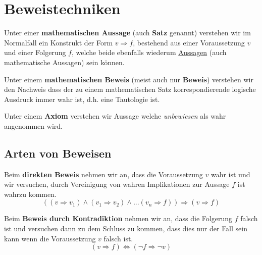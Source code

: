 \documentclass[../../main.tex]{subfiles}
\begin{document}
	
	\chapter{Beweistechniken}
	
	\begin{definition}
		\label{def:MathematischeAussage}
		Unter einer \textbf{mathematischen Aussage} (auch \textbf{Satz} genannt) verstehen wir im Normalfall ein Konstrukt der Form $v \Rightarrow f$, bestehend aus einer Voraussetzung $v$ und einer Folgerung $f$, welche beide ebenfalls wiederum \hyperref[def:Aussage]{Aussagen} (auch mathematische Aussagen) sein können.
	\end{definition}

	\begin{definition}
		\label{def:MathematischerBeweis}
		Unter einem \textbf{mathematischen Beweis} (meist auch nur \textbf{Beweis}) verstehen wir den Nachweis dass der zu einem mathematischen Satz korrespondierende logische Ausdruck immer wahr ist, d.h. eine Tautologie ist.
	\end{definition}

	\begin{definition}[Axiom]
		Unter einem \textbf{Axiom} verstehen wir Aussage welche \textit{unbewiesen} als wahr angenommen wird. 
	\end{definition}



	\section{Arten von Beweisen}
	
	\begin{definition}
		Beim \textbf{direkten Beweis} nehmen wir an, dass die Voraussetzung $v$ wahr ist und wir versuchen, durch Vereinigung von wahren Implikationen zur Aussage \dq$f$ ist wahr\dq zu kommen.
		$$((v \Rightarrow v_1) \land (v_1 \Rightarrow v_2) \land ... (v_n \Rightarrow f)) \Rightarrow (v \Rightarrow f)$$
	\end{definition}

	\begin{definition}
		Beim \textbf{Beweis durch Kontradiktion} nehmen wir an, dass die Folgerung $f$ falsch ist und versuchen dann zu dem Schluss zu kommen, dass dies nur der Fall sein kann wenn die Voraussetzung $v$ falsch ist. 
		$$(v \Rightarrow f) \Leftrightarrow (\lnot f \Rightarrow \lnot v)$$
	\end{definition}
\end{document}
